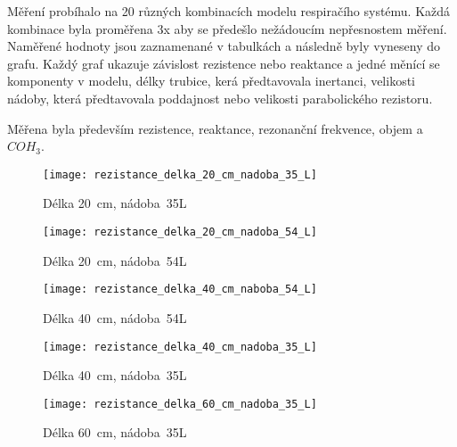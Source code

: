 Měření probíhalo na 20 různých kombinacích modelu respiračího systému. Každá kombinace byla proměřena 3x aby se předešlo nežádoucím nepřesnostem měření. Naměřené hodnoty jsou zaznamenané v tabulkách a následně byly vyneseny do grafu. Každý graf ukazuje závislost rezistence nebo reaktance a jedné měnící se komponenty v modelu, délky trubice, kerá předtavovala inertanci, velikosti nádoby, která předtavovala poddajnost nebo velikosti parabolického rezistoru.

Měřena byla především rezistence, reaktance, rezonanční frekvence, objem a $COH_{3}$. 

\begin{figure}[ht]
	\label{img:pic_rezistance_delka_20_cm_nadoba_35_L}
	\begin{center}
		\texttt{[image: rezistance\_delka\_20\_cm\_nadoba\_35\_L]}
		\caption{Délka \SI{20}{cm}, nádoba~35L}
	\end{center}
\end{figure}

\begin{figure}[ht]
	\label{img:pic_rezistance_delka_20_cm_nadoba_54_L}
	\begin{center}
		\texttt{[image: rezistance\_delka\_20\_cm\_nadoba\_54\_L]}
		\caption{Délka \SI{20}{cm}, nádoba~54L}
	\end{center}
\end{figure}

\begin{figure}[ht]
	\label{img:pic_rezistance_delka_40_cm_naboba_54_L}
	\begin{center}
		\texttt{[image: rezistance\_delka\_40\_cm\_naboba\_54\_L]}
		\caption{Délka \SI{40}{cm}, nádoba~54L}
	\end{center}
\end{figure}

\begin{figure}[ht]
	\label{img:pic_rezistance_delka_40_cm_nadoba_35_L}
	\begin{center}
		\texttt{[image: rezistance\_delka\_40\_cm\_nadoba\_35\_L]}
		\caption{Délka \SI{40}{cm}, nádoba~35L}
	\end{center}
\end{figure}

\begin{figure}[ht]
	\label{img:pic_rezistance_delka_60_cm_nadoba_35_L}
	\begin{center}
		\texttt{[image: rezistance\_delka\_60\_cm\_nadoba\_35\_L]}
		\caption{Délka \SI{60}{cm}, nádoba~35L}
	\end{center}
\end{figure}


